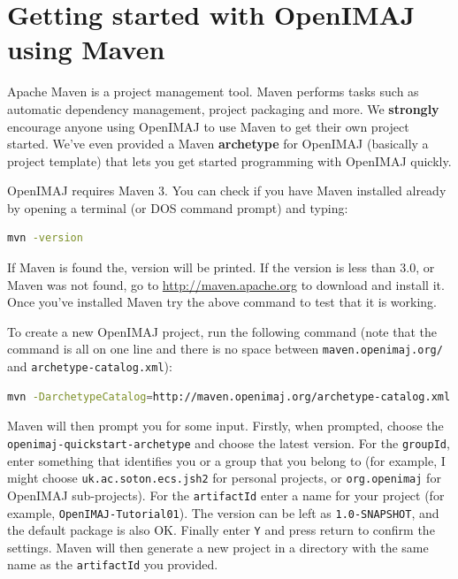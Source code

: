 \chapter{Getting started with OpenIMAJ using Maven}
\pagestyle{headings}
Apache Maven is a project management tool.  Maven performs tasks such 
as automatic  dependency management, project packaging and more. We \textbf{strongly} 
encourage anyone using OpenIMAJ to use Maven to get their own project started. 
We've even provided a Maven \textbf{archetype} for OpenIMAJ (basically a project template) 
that lets you get started programming with OpenIMAJ quickly. 

OpenIMAJ requires Maven 3. You can check if you have Maven installed already 
by opening a terminal (or DOS command prompt) and typing:
\begin{lstlisting}[language=bash]
mvn -version
\end{lstlisting}
If Maven is found the, version will be printed. If the version is less than 3.0, 
or Maven was not found, go to \url{http://maven.apache.org} to download and 
install it. Once you've installed Maven try the above command to test that it 
is working.

To create a new OpenIMAJ project, run the following command (note that the command is all on one line and there is no space between \verb+maven.openimaj.org/+ and \verb+archetype-catalog.xml+):
\begin{lstlisting}[language=bash]
mvn -DarchetypeCatalog=http://maven.openimaj.org/archetype-catalog.xml archetype:generate
\end{lstlisting}

Maven will then prompt you for some input.  Firstly, when prompted, choose 
the \texttt{openimaj-quickstart-archetype} and choose the latest version. For the \verb+groupId+, 
enter something that identifies you or a group that you belong to (for example, I might choose 
\verb+uk.ac.soton.ecs.jsh2+ for personal projects, or \verb+org.openimaj+ for OpenIMAJ sub-projects). 
For the \verb+artifactId+ enter a name for your project (for example, \verb+OpenIMAJ-Tutorial01+). The 
version can be left as \verb+1.0-SNAPSHOT+, and the default package is also OK. Finally enter \verb+Y+ and press return
to confirm the settings. Maven will then generate a new project in a directory with the same 
name as the \verb+artifactId+ you provided.

